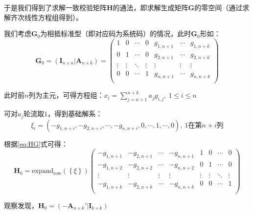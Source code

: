 \begin{Solution}
        于是我们得到了求解一致校验矩阵$\bm{H}$的通法，即求解生成矩阵$\bm{G}$的零空间（通过求解齐次线性方程组得到）。

        我们考虑$\bm{G}_0$为相抵标准型（即对应码为系统码）的情况，此时$\bm{G}_0$形如：
        \begin{equation}
            \bm{G}_0 = \left(\bm{I}_{n\times n} | \bm{A}_{n\times k}\right)=
            \left(
                \begin{matrix}
                    1 &0  &\cdots &0 &g_{1, n+1} &\cdots & g_{1, n+k}\\
                    0 &1  &\cdots &0 &g_{2, n+1} &\cdots & g_{2, n+k}\\
                    \vdots  &\vdots &\ddots &\vdots &\vdots &\vdots&\vdots\\
                    0 & 0  &\cdots  & 1 & g_{n, n+1} & \cdots & g_{n, n+k}\\
                \end{matrix}
            \right)
        \end{equation}

        此时前$n$列为主元，可得方程组：$x_i = \sum_{j=n+1}^{n+k}a_jg_{i,j},~1\leq i \leq n$

        可对$a_j$轮流取$1$，得到基础解系：
        \begin{equation}
            \xi_i = (-g_{1, n+i}, -g_{2, n+i}, \cdots, -g_{n, n+i}, 0, \cdots, 1, \cdots, 0),~1\text{在第}n+i\text{列}
        \end{equation}

        根据\ref{eq:HG}式可得：
        \begin{equation}
            \bm{H}_0 = \mathrm{expand_{row}}(\left\{\xi\right\})
            \left(
                \begin{matrix}
                    -g_{1, n+1}& -g_{2, n+1}& \cdots& -g_{n, n+1} & 1 & 0 & \cdots & 0\\
                    -g_{1, n+2}& -g_{2, n+2}& \cdots& -g_{n, n+2} & 0 & 1 & \cdots & 0\\
                    \vdots &\vdots &\vdots &\vdots &\vdots &\vdots &\ddots&\vdots\\
                    -g_{1, n+k}& -g_{2, n+k}& \cdots& -g_{n, n+k} & 0  & 0& \cdots & 1\\
                \end{matrix}
            \right)
        \end{equation}

        观察发现，$\bm{H}_0 = \left( -\bm{A}_{n\times k}' |\bm{I}_{k\times k}\right)$


\end{Solution}
